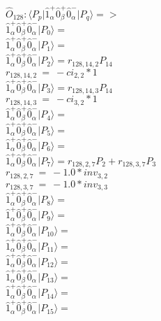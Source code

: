 \documentclass[14pt]{article}
\begin{document}
    $\hat{O}_{128}:  \langle{P_p}\vert \hat{1}_{\alpha}^{+}\hat{0}_{\beta}^{+}\hat{0}_{\alpha}^{-} \vert{P_q}\rangle => $ \\ 
    $ \hat{1}_{\alpha}^{+}\hat{0}_{\beta}^{+}\hat{0}_{\alpha}^{-} \vert{P_{0}}\rangle =  $ \\ 
    $ \hat{1}_{\alpha}^{+}\hat{0}_{\beta}^{+}\hat{0}_{\alpha}^{-} \vert{P_{1}}\rangle =  $ \\ 
    $ \hat{1}_{\alpha}^{+}\hat{0}_{\beta}^{+}\hat{0}_{\alpha}^{-} \vert{P_{2}}\rangle = {r}_{128,14,2}P_{14} $ \\ 
    ${r}_{128,14,2}\ =\ -{ci}_{2,2}*1 $ \\ 
    $ \hat{1}_{\alpha}^{+}\hat{0}_{\beta}^{+}\hat{0}_{\alpha}^{-} \vert{P_{3}}\rangle = {r}_{128,14,3}P_{14} $ \\ 
    ${r}_{128,14,3}\ =\ -{ci}_{3,2}*1 $ \\ 
    $ \hat{1}_{\alpha}^{+}\hat{0}_{\beta}^{+}\hat{0}_{\alpha}^{-} \vert{P_{4}}\rangle =  $ \\ 
    $ \hat{1}_{\alpha}^{+}\hat{0}_{\beta}^{+}\hat{0}_{\alpha}^{-} \vert{P_{5}}\rangle =  $ \\ 
    $ \hat{1}_{\alpha}^{+}\hat{0}_{\beta}^{+}\hat{0}_{\alpha}^{-} \vert{P_{6}}\rangle =  $ \\ 
    $ \hat{1}_{\alpha}^{+}\hat{0}_{\beta}^{+}\hat{0}_{\alpha}^{-} \vert{P_{7}}\rangle = {r}_{128,2,7}P_{2}+{r}_{128,3,7}P_{3} $ \\ 
    ${r}_{128,2,7}\ =\ -1.0*{inv}_{3,2} $ \\ 
    ${r}_{128,3,7}\ =\ -1.0*{inv}_{3,3} $ \\ 
    $ \hat{1}_{\alpha}^{+}\hat{0}_{\beta}^{+}\hat{0}_{\alpha}^{-} \vert{P_{8}}\rangle =  $ \\ 
    $ \hat{1}_{\alpha}^{+}\hat{0}_{\beta}^{+}\hat{0}_{\alpha}^{-} \vert{P_{9}}\rangle =  $ \\ 
    $ \hat{1}_{\alpha}^{+}\hat{0}_{\beta}^{+}\hat{0}_{\alpha}^{-} \vert{P_{10}}\rangle =  $ \\ 
    $ \hat{1}_{\alpha}^{+}\hat{0}_{\beta}^{+}\hat{0}_{\alpha}^{-} \vert{P_{11}}\rangle =  $ \\ 
    $ \hat{1}_{\alpha}^{+}\hat{0}_{\beta}^{+}\hat{0}_{\alpha}^{-} \vert{P_{12}}\rangle =  $ \\ 
    $ \hat{1}_{\alpha}^{+}\hat{0}_{\beta}^{+}\hat{0}_{\alpha}^{-} \vert{P_{13}}\rangle =  $ \\ 
    $ \hat{1}_{\alpha}^{+}\hat{0}_{\beta}^{+}\hat{0}_{\alpha}^{-} \vert{P_{14}}\rangle =  $ \\ 
    $ \hat{1}_{\alpha}^{+}\hat{0}_{\beta}^{+}\hat{0}_{\alpha}^{-} \vert{P_{15}}\rangle =  $ \\ 
    
\end{document}
